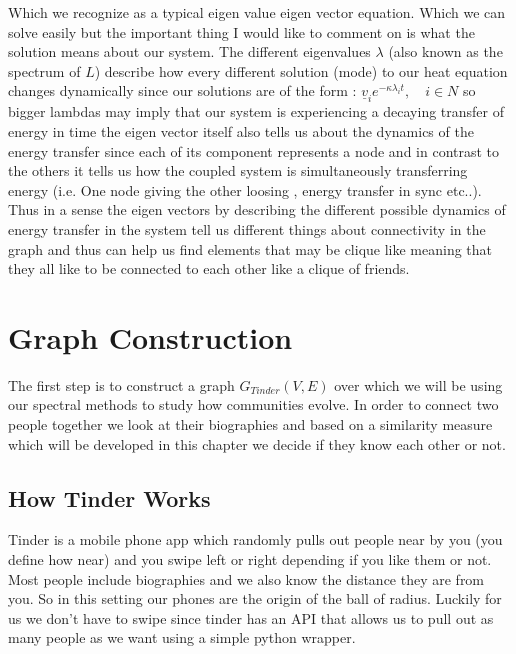 \documentclass[10pt,twocolumn]{article}
\begin{document}
Which we recognize as a typical eigen value eigen vector equation. Which we can solve easily but the important thing I would like to comment on is what the solution means about our system. The different eigenvalues $\lambda$ (also known as the spectrum of $L$) describe how every different solution (mode) to our heat equation changes dynamically since our solutions are of the form :  $\underline{v}_{i}e^{-\kappa\lambda_{i} t}, \quad i \in N$ so bigger lambdas may imply that our system is experiencing a decaying transfer of energy in time the eigen vector itself also tells us about the dynamics of the energy transfer since each of its component represents a node and in contrast to the others it tells us how the coupled system is simultaneously transferring energy (i.e. One node giving the other loosing , energy transfer in sync etc..). Thus in a sense the eigen vectors by describing the different possible dynamics of energy transfer in the system tell us different things about connectivity in the graph and thus can  help us find elements that may be clique like meaning that they all like to be connected to each other like a clique of friends.

\section{Graph Construction}
The first step is to construct a graph $G_{Tinder}(V,E)$ over which we will be using our spectral methods to study how communities evolve. In order to connect two people together we look at their biographies and based on a similarity measure which will be developed in this chapter we decide if they know each other or not. 
\subsection{How Tinder Works}
Tinder is a mobile phone app which randomly pulls out people near by you (you define how near) and you swipe left or right depending if you like them or not. Most people include biographies and we also know the distance they are from you. So in this setting our phones are the origin of the ball of radius. Luckily for us we don't have to swipe since tinder has an API that allows us to  pull out as many people as we want using a simple python wrapper.
\end{document}
